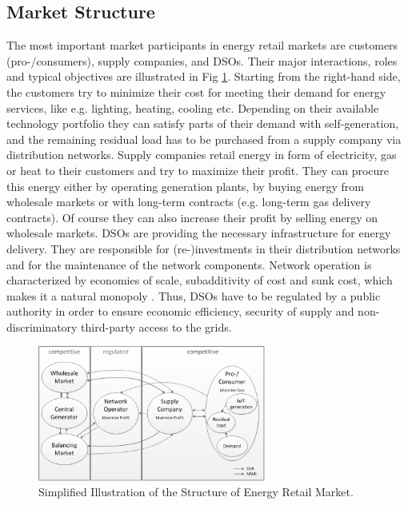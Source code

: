 \documentclass[a4paper,twoside]{article}
\begin{document}
\subsection{Market Structure}
\label{sec:econ-1}

The most important market participants in energy retail markets are
customers (pro-/consumers), supply companies, and DSOs. Their
major interactions, roles and typical objectives are illustrated in
Fig  \ref{fig:market_structure}. 
Starting from the right-hand side, the customers try to minimize their
cost for meeting their demand for energy services, like e.g. lighting,
heating, cooling etc. Depending on their available technology
portfolio they can satisfy parts of their demand with self-generation,
and the remaining residual load has to be purchased from a supply
company via distribution networks. 
Supply companies retail energy in form of electricity, gas or heat to
their customers and try to maximize their profit. They can procure
this energy either by operating generation plants, by buying energy
from wholesale markets or with long-term contracts (e.g. long-term gas
delivery contracts). Of course they can also increase their profit by
selling energy on wholesale markets. 
DSOs are providing the necessary infrastructure for energy
delivery. They are responsible for (re-)investments in their
distribution networks and for the maintenance of the network
components. Network operation is characterized by economies of scale,
subadditivity of cost and sunk cost, which makes it a natural
monopoly \cite{auer_2011}. Thus, DSOs have to be regulated by a public
authority in order to ensure economic efficiency, security of supply
and non-discriminatory third-party access to the grids.  

\begin{figure}[t]
  \centering
  \includegraphics[width=75mm]{figures/market_structure.png}
  \caption{Simplified Illustration of the Structure of Energy Retail
    Market.}
  \label{fig:market_structure}
\end{figure}
\end{document}

